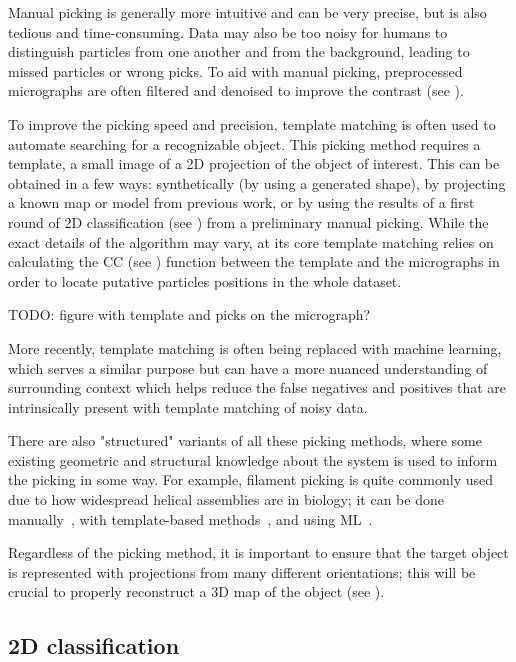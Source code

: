 Manual picking is generally more intuitive and can be very precise, but is also tedious and time-consuming.
Data may also be too noisy for humans to distinguish particles from one another and from the background, leading to missed particles or wrong picks.
To aid with manual picking, preprocessed micrographs are often filtered and denoised to improve the contrast (see ).

To improve the picking speed and precision, template matching is often used to automate searching for a recognizable object.
This picking method requires a template, a small image of a 2D projection of the object of interest.
This can be obtained in a few ways: synthetically (by using a generated shape), by projecting a known map or model from previous work, or by using the results of a first round of 2D classification (see ) from a preliminary manual picking.
While the exact details of the algorithm may vary, at its core template matching relies on calculating the CC (see ) function between the template and the micrographs in order to locate putative particles positions in the whole dataset.

TODO: figure with template and picks on the micrograph?

More recently, template matching is often being replaced with machine learning, which serves a similar purpose but can have a more nuanced understanding of surrounding context which helps reduce the false negatives and positives that are intrinsically present with template matching of noisy data.

There are also "structured" variants of all these picking methods, where some existing geometric and structural knowledge about the system is used to inform the picking in some way.
For example, filament picking is quite commonly used due to how widespread helical assemblies are in biology; it can be done manually~\cite{scheresRELIONImplementationBayesian2012,heHelicalReconstructionRELION2017}, with template-based methods~\cite{punjaniCryoSPARCAlgorithmsRapid2017}, and using ML~\cite{wagnerSPHIREcrYOLOFastAccurate2019,wagnerEvolutionSPHIREcrYOLOParticle2020}.

Regardless of the picking method, it is important to ensure that the target object is represented with projections from many different orientations; this will be crucial to properly reconstruct a 3D map of the object (see ).

\subsection{2D classification}\label{em_classification}

